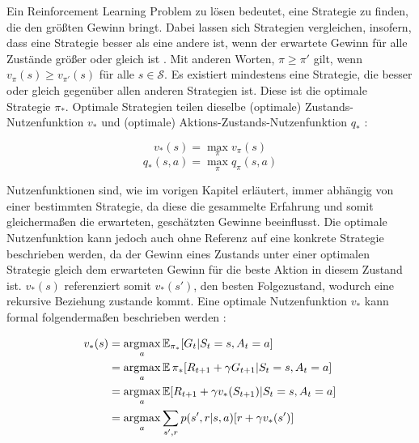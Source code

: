 Ein Reinforcement Learning Problem zu lösen bedeutet, eine Strategie zu finden, die den größten Gewinn bringt. Dabei lassen sich Strategien vergleichen, insofern, dass eine Strategie besser als eine andere ist, wenn der erwartete Gewinn für alle Zustände größer oder gleich ist \cite[S.~62f]{Sutton1998}. Mit anderen Worten, $\pi \geq \pi'$ gilt, wenn $v_\pi(s) \geq v_{\pi'}(s)$ für alle $s \in \mathcal{S}$. Es existiert mindestens eine Strategie, die besser oder gleich gegenüber allen anderen Strategien ist. Diese ist die optimale Strategie $\pi_*$. Optimale Strategien teilen dieselbe (optimale) Zustands-Nutzenfunktion $v_*$ und (optimale) Aktions-Zustands-Nutzenfunktion $q_*$ \cite[S.~62f]{Sutton1998}:

\begin{equation}\label{eq:optimaleValueFunction}
    v_*(s) = \max_\pi v_\pi(s)
\end{equation}
\begin{equation}\label{eq:optimaleActionValueFunction}
    q_*(s,a) = \max_\pi q_\pi(s,a)
\end{equation}

Nutzenfunktionen sind, wie im vorigen Kapitel erläutert, immer abhängig von einer bestimmten Strategie, da diese die gesammelte Erfahrung und somit gleichermaßen die erwarteten, geschätzten Gewinne beeinflusst. Die optimale Nutzenfunktion kann jedoch auch ohne Referenz auf eine konkrete Strategie beschrieben werden, da der Gewinn eines Zustands unter einer optimalen Strategie gleich dem erwarteten Gewinn für die beste Aktion in diesem Zustand ist. $v_*(s)$ referenziert somit $v_*(s')$, den besten Folgezustand, wodurch eine rekursive Beziehung zustande kommt. Eine optimale Nutzenfunktion $v_*$ kann formal folgendermaßen beschrieben werden \cite[S.~63]{Sutton1998}:

\begin{equation}\label{eq:bellmanValue}
    \begin{aligned}
        v_*(s) &= \operatorname*{argmax}_a \operatorname{\mathbb{E}}_{\pi_*}[G_t | S_t = s, A_t = a] \\
        &= \operatorname*{argmax}_a \operatorname{\mathbb{E}}{\pi_*}[ R_{t+1} + \gamma G_{t+1} | S_t = s, A_t = a] \\
        &= \operatorname*{argmax}_a \operatorname{\mathbb{E}}[ R_{t+1} + \gamma v_*(S_{t+1}) | S_t = s, A_t = a] \\
        &= \operatorname*{argmax}_a \sum_{s',r}p(s', r | s,a)[r+ \gamma v_*(s')]
    \end{aligned}
\end{equation}

